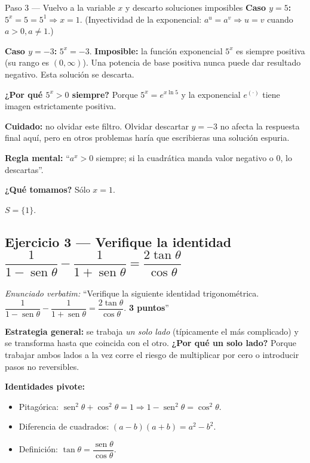 \documentclass[11pt]{article}
\DeclareMathOperator{\sen}{sen}
\begin{document}
\begin{paso}{Paso 3 --- Vuelvo a la variable $x$ y descarto soluciones imposibles}
\textbf{Caso $y=5$:} $5^x=5=5^1\Rightarrow x=1$. (Inyectividad de la exponencial: $a^u=a^v\Rightarrow u=v$ cuando $a>0,a\neq 1$.)

\textbf{Caso $y=-3$:} $5^x=-3$. \textbf{Imposible:} la función exponencial $5^x$ es siempre positiva (su rango es $(0,\infty)$). Una potencia de base positiva nunca puede dar resultado negativo. Esta solución se descarta.

\textbf{¿Por qué $5^x>0$ siempre?} Porque $5^x=e^{x\ln 5}$ y la exponencial $e^{(\cdot)}$ tiene imagen estrictamente positiva.

\textbf{Cuidado:} no olvidar este filtro. Olvidar descartar $y=-3$ no afecta la respuesta final aquí, pero en otros problemas haría que escribieras una solución espuria.

\textbf{Regla mental:} ``$a^x>0$ siempre; si la cuadrática manda valor negativo o $0$, lo descartas''.

\textbf{¿Qué tomamos?} Sólo $x=1$.
\end{paso}

\begin{resp}
$S=\{1\}$.
\end{resp}

\subsection*{Ejercicio 3 --- Verifique la identidad $\dfrac{1}{1-\sen\theta}-\dfrac{1}{1+\sen\theta}=\dfrac{2\tan\theta}{\cos\theta}$}

\textit{Enunciado verbatim:} ``Verifique la siguiente identidad trigonométrica.
$\dfrac{1}{1-\sen\theta}-\dfrac{1}{1+\sen\theta}=\dfrac{2\tan\theta}{\cos\theta}$. \textbf{3 puntos}''

\begin{teo}
\textbf{Estrategia general:} se trabaja \emph{un solo lado} (típicamente el más complicado) y se transforma hasta que coincida con el otro. \textbf{¿Por qué un solo lado?} Porque trabajar ambos lados a la vez corre el riesgo de multiplicar por cero o introducir pasos no reversibles.

\textbf{Identidades pivote:}
\begin{itemize}[leftmargin=*]
  \item Pitagórica: $\sen^2\theta+\cos^2\theta=1\Rightarrow 1-\sen^2\theta=\cos^2\theta$.
  \item Diferencia de cuadrados: $(a-b)(a+b)=a^2-b^2$.
  \item Definición: $\tan\theta=\dfrac{\sen\theta}{\cos\theta}$.
\end{itemize}
\end{teo}
\end{document}

